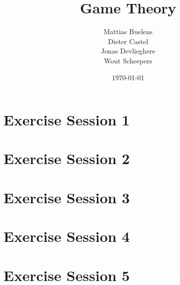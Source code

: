 \documentclass[a4paper, 11pt, oneside]{article}
\title{Game Theory}
\date{\today}
\author{Mattias Buelens \\ Dieter Castel \\ Jonas Devlieghere \\ Wout Scheepers}
\numberwithin{question}{section}
\theoremstyle{definition}
\numberwithin{solution}{section}
\begin{document}
\maketitle
\newpage

\tableofcontents
\newpage

\section{Exercise Session 1}


\section{Exercise Session 2}


\section{Exercise Session 3}


\section{Exercise Session 4}


\section{Exercise Session 5}


\nocite{*}
\printbibliography
\end{document}
